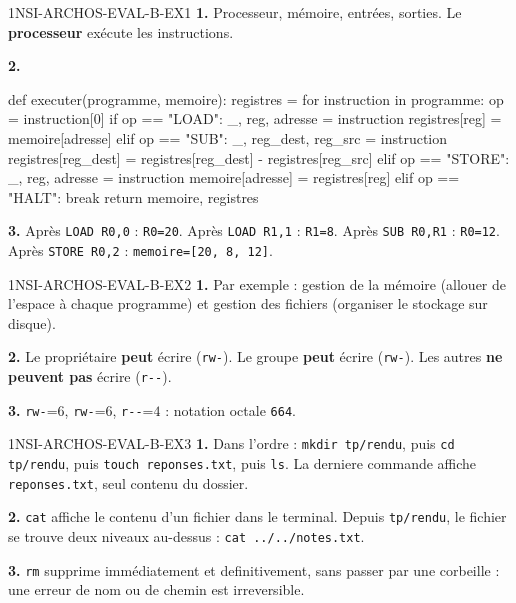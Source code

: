 \begin{corrige}{1NSI-ARCHOS-EVAL-B-EX1}
\textbf{1.} Processeur, mémoire, entrées, sorties. Le \textbf{processeur} exécute les
instructions.

\textbf{2.}
\begin{python}
def executer(programme, memoire):
    registres = {}
    for instruction in programme:
        op = instruction[0]
        if op == "LOAD":
            _, reg, adresse = instruction
            registres[reg] = memoire[adresse]
        elif op == "SUB":
            _, reg_dest, reg_src = instruction
            registres[reg_dest] = registres[reg_dest] - registres[reg_src]
        elif op == "STORE":
            _, reg, adresse = instruction
            memoire[adresse] = registres[reg]
        elif op == "HALT":
            break
    return memoire, registres
\end{python}

\textbf{3.} Après \lstinline{LOAD R0,0} : \lstinline{R0=20}. Après \lstinline{LOAD R1,1} :
\lstinline{R1=8}. Après \lstinline{SUB R0,R1} : \lstinline{R0=12}. Après
\lstinline{STORE R0,2} : \lstinline{memoire=[20, 8, 12]}.
\end{corrige}

\begin{corrige}{1NSI-ARCHOS-EVAL-B-EX2}
\textbf{1.} Par exemple : gestion de la mémoire (allouer de l'espace à chaque programme)
et gestion des fichiers (organiser le stockage sur disque).

\textbf{2.} Le propriétaire \textbf{peut} écrire (\lstinline{rw-}). Le groupe \textbf{peut}
écrire (\lstinline{rw-}). Les autres \textbf{ne peuvent pas} écrire (\lstinline{r--}).

\textbf{3.} \lstinline{rw-}=$6$, \lstinline{rw-}=$6$, \lstinline{r--}=$4$ : notation
octale \lstinline{664}.
\end{corrige}

\begin{corrige}{1NSI-ARCHOS-EVAL-B-EX3}
\textbf{1.} Dans l'ordre : \lstinline{mkdir tp/rendu}, puis \lstinline{cd tp/rendu},
puis \lstinline{touch reponses.txt}, puis \lstinline{ls}. La derniere commande affiche
\lstinline{reponses.txt}, seul contenu du dossier.

\textbf{2.} \lstinline{cat} affiche le contenu d'un fichier dans le terminal. Depuis
\lstinline{tp/rendu}, le fichier se trouve deux niveaux au-dessus : \lstinline{cat ../../notes.txt}.

\textbf{3.} \lstinline{rm} supprime immédiatement et definitivement, sans passer par une
corbeille : une erreur de nom ou de chemin est irreversible.
\end{corrige}
